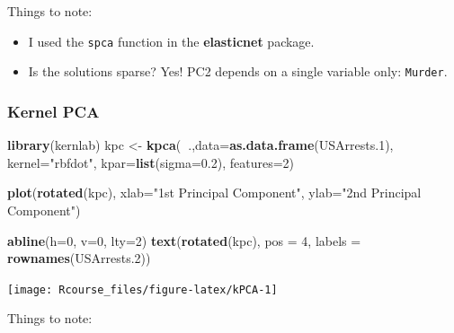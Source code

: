 \documentclass[]{book}
\newenvironment{Shaded}{\begin{snugshade}}{\end{snugshade}}
\newcommand{\DataTypeTok}[1]{\textcolor[rgb]{0.13,0.29,0.53}{#1}}
\newcommand{\DecValTok}[1]{\textcolor[rgb]{0.00,0.00,0.81}{#1}}
\newcommand{\FloatTok}[1]{\textcolor[rgb]{0.00,0.00,0.81}{#1}}
\newcommand{\KeywordTok}[1]{\textcolor[rgb]{0.13,0.29,0.53}{\textbf{#1}}}
\newcommand{\NormalTok}[1]{#1}
\newcommand{\OperatorTok}[1]{\textcolor[rgb]{0.81,0.36,0.00}{\textbf{#1}}}
\newcommand{\StringTok}[1]{\textcolor[rgb]{0.31,0.60,0.02}{#1}}
\providecommand{\tightlist}{%
  \setlength{\itemsep}{0pt}\setlength{\parskip}{0pt}}
\theoremstyle{definition}
\theoremstyle{definition}
\theoremstyle{definition}
\theoremstyle{remark}
\begin{document}
Things to note:

\begin{itemize}
\tightlist
\item
  I used the \texttt{spca} function in the \textbf{elasticnet} package.
\item
  Is the solutions sparse? Yes! PC2 depends on a single variable only: \texttt{Murder}.
\end{itemize}

\hypertarget{kernel-pca}{%
\subsubsection{Kernel PCA}\label{kernel-pca}}

\begin{Shaded}
\begin{Highlighting}[]
\KeywordTok{library}\NormalTok{(kernlab)}
\NormalTok{kpc <-}\StringTok{ }\KeywordTok{kpca}\NormalTok{(}\OperatorTok{~}\NormalTok{.,}\DataTypeTok{data=}\KeywordTok{as.data.frame}\NormalTok{(USArrests}\FloatTok{.1}\NormalTok{), }\DataTypeTok{kernel=}\StringTok{"rbfdot"}\NormalTok{, }\DataTypeTok{kpar=}\KeywordTok{list}\NormalTok{(}\DataTypeTok{sigma=}\FloatTok{0.2}\NormalTok{), }\DataTypeTok{features=}\DecValTok{2}\NormalTok{)}

\KeywordTok{plot}\NormalTok{(}\KeywordTok{rotated}\NormalTok{(kpc),}
     \DataTypeTok{xlab=}\StringTok{"1st Principal Component"}\NormalTok{,}
     \DataTypeTok{ylab=}\StringTok{"2nd Principal Component"}\NormalTok{)}

\KeywordTok{abline}\NormalTok{(}\DataTypeTok{h=}\DecValTok{0}\NormalTok{, }\DataTypeTok{v=}\DecValTok{0}\NormalTok{, }\DataTypeTok{lty=}\DecValTok{2}\NormalTok{)}
\KeywordTok{text}\NormalTok{(}\KeywordTok{rotated}\NormalTok{(kpc), }\DataTypeTok{pos =} \DecValTok{4}\NormalTok{, }\DataTypeTok{labels =} \KeywordTok{rownames}\NormalTok{(USArrests}\FloatTok{.2}\NormalTok{))}
\end{Highlighting}
\end{Shaded}

\texttt{[image: Rcourse\_files/figure-latex/kPCA-1]}

Things to note:
\end{document}
